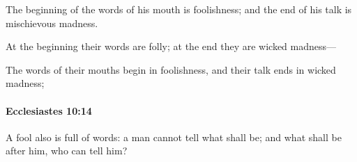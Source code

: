 			\begin{versebox}
					\item[BHS] 
					\item[LXX] 
					\item[ASV] The beginning of the words of his mouth is foolishness; and the end of his talk is mischievous madness.
					\item[NIV] At the beginning their words are folly; at the end they are wicked madness—
					\item[NRSV] The words of their mouths begin in foolishness, and their talk ends in wicked madness;
			\end{versebox}

		\paragraph{Ecclesiastes 10:14} %
			\label{ECCLESIASTES-10-14}

			A fool also is full of words: a man cannot tell what shall be; and what shall be after him, who can tell him?

